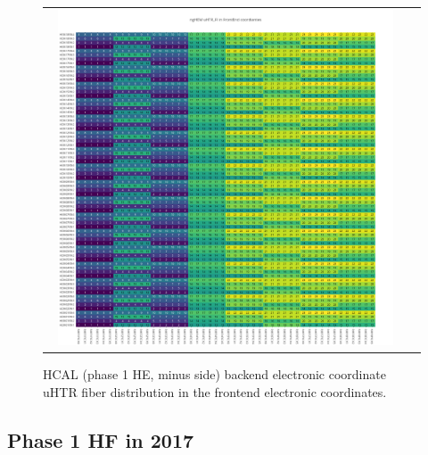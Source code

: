 \begin{figure}[htb]
 \begin{center}
  \begin{tabular}{cc}
   \includegraphics[angle=0,width=0.95\textwidth]{figures/appendix/ngHEM_uHTR_FI_in_FrontEnd.png}
  \end{tabular}
  \caption{HCAL (phase 1 HE, minus side) backend electronic coordinate uHTR fiber distribution in the frontend electronic coordinates.}
  \label{fig:lmapngHEMuHTRFIFEC}
 \end{center}
\end{figure}
\clearpage

\subsection{Phase 1 HF in 2017}
\clearpage

